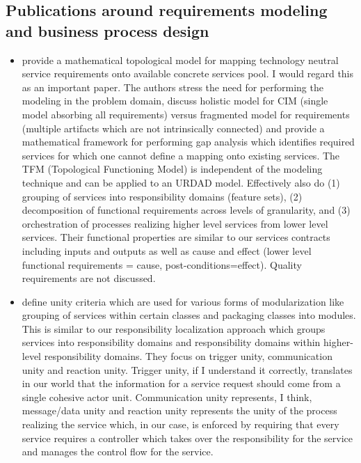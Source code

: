 
\subsection{Publications around requirements modeling and business process design}
  \begin{itemize}
   \item \cite{asnina_computation_2010} provide a mathematical topological model for mapping technology neutral service requirements onto available concrete services pool. I would regard this as an important paper. The authors stress the need for performing the modeling in the problem domain, discuss holistic model for CIM (single model absorbing all requirements) versus fragmented model for requirements (multiple artifacts which are not intrinsically connected) and provide a mathematical framework for performing gap analysis which identifies required services for which one cannot define a mapping onto existing services. The TFM (Topological Functioning Model) is independent of the modeling technique and can be applied to an URDAD model. Effectively also do (1) grouping of services into responsibility domains (feature sets), (2) decomposition of functional requirements across levels of granularity, and (3) orchestration of processes realizing higher level services from lower level services. Their functional properties are similar to our services contracts including inputs and outputs as well as cause and effect (lower level functional requirements = cause, post-conditions=effect). Quality requirements are not discussed. 
   \item \cite{gonzalez_unity_2009} define unity criteria which are used for various forms of modularization like grouping of services within certain classes and packaging classes into modules. This is similar to our responsibility localization approach which groups services into responsibility domains and responsibility domains within higher-level responsibility domains. They focus on trigger unity, communication unity and reaction unity. Trigger unity, if I understand it correctly, translates in our world that the information for a service request should come from a single cohesive actor unit. Communication unity represents, I think, message/data unity and reaction unity represents the unity of the process realizing the service which, in our case, is enforced by requiring that every service requires a controller which takes over the responsibility for the service and manages the control flow for the service.

\end{itemize}
